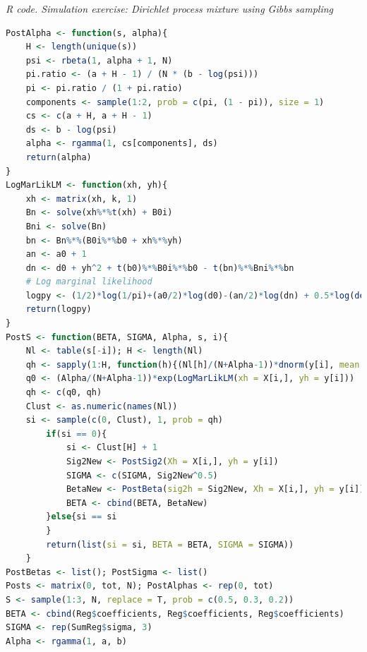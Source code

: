 \begin{tcolorbox}[enhanced,width=4.67in,center upper,
	fontupper=\large\bfseries,drop shadow southwest,sharp corners]
	\textit{R code. Simulation exercise: Dirichlet process mixture using Gibbs sampling}
	\begin{VF}
		\begin{lstlisting}[language=R]
PostAlpha <- function(s, alpha){
	H <- length(unique(s))
	psi <- rbeta(1, alpha + 1, N)
	pi.ratio <- (a + H - 1) / (N * (b - log(psi)))
	pi <- pi.ratio / (1 + pi.ratio)
	components <- sample(1:2, prob = c(pi, (1 - pi)), size = 1)
	cs <- c(a + H, a + H - 1)
	ds <- b - log(psi)
	alpha <- rgamma(1, cs[components], ds)
	return(alpha)
}
LogMarLikLM <- function(xh, yh){
	xh <- matrix(xh, k, 1)
	Bn <- solve(xh%*%t(xh) + B0i)
	Bni <- solve(Bn)
	bn <- Bn%*%(B0i%*%b0 + xh%*%yh)
	an <- a0 + 1
	dn <- d0 + yh^2 + t(b0)%*%B0i%*%b0 - t(bn)%*%Bni%*%bn 
	# Log marginal likelihood
	logpy <- (1/2)*log(1/pi)+(a0/2)*log(d0)-(an/2)*log(dn) + 0.5*log(det(Bn)/det(B0)) + lgamma(an/2)-lgamma(a0/2)
	return(logpy)
}
PostS <- function(BETA, SIGMA, Alpha, s, i){
	Nl <- table(s[-i]); H <- length(Nl)
	qh <- sapply(1:H, function(h){(Nl[h]/(N+Alpha-1))*dnorm(y[i], mean = t(X[i,])%*%BETA[,h], sd = SIGMA[h])})
	q0 <- (Alpha/(N+Alpha-1))*exp(LogMarLikLM(xh = X[i,], yh = y[i]))
	qh <- c(q0, qh)
	Clust <- as.numeric(names(Nl))
	si <- sample(c(0, Clust), 1, prob = qh)
		if(si == 0){
			si <- Clust[H] + 1
			Sig2New <- PostSig2(Xh = X[i,], yh = y[i])
			SIGMA <- c(SIGMA, Sig2New^0.5)
			BetaNew <- PostBeta(sig2h = Sig2New, Xh = X[i,], yh = y[i])
			BETA <- cbind(BETA, BetaNew)
		}else{si == si
		}
		return(list(si = si, BETA = BETA, SIGMA = SIGMA))
	}
PostBetas <- list(); PostSigma <- list()
Posts <- matrix(0, tot, N); PostAlphas <- rep(0, tot)
S <- sample(1:3, N, replace = T, prob = c(0.5, 0.3, 0.2))
BETA <- cbind(Reg$coefficients, Reg$coefficients, Reg$coefficients)
SIGMA <- rep(SumReg$sigma, 3)
Alpha <- rgamma(1, a, b)
\end{lstlisting}
	\end{VF}
\end{tcolorbox}

